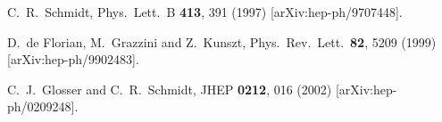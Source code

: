 \documentclass[12pt]{article}
\begin{document}
\begin{thebibliography}{99}
C.~R.~Schmidt,
Phys.\ Lett.\ B {\bf 413}, 391 (1997)
[arXiv:hep-ph/9707448].

D.~de Florian, M.~Grazzini and Z.~Kunszt,
Phys.\ Rev.\ Lett.\  {\bf 82}, 5209 (1999)
[arXiv:hep-ph/9902483].

C.~J.~Glosser and C.~R.~Schmidt,
JHEP {\bf 0212}, 016 (2002)
[arXiv:hep-ph/0209248].

\end{thebibliography}
\end{document}
